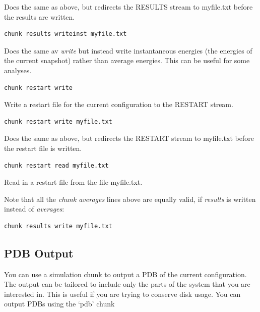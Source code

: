\documentclass[letterpaper,10pt,english]{sphinxmanual}
\begin{document}
Does the same as above, but redirects the RESULTS stream to myfile.txt before the results are written.

\begin{Verbatim}[commandchars=\\\{\}]
chunk results writeinst myfile.txt
\end{Verbatim}

Does the same av \emph{write} but instead write instantaneous energies (the energies of the current snapshot) rather than average energies. This can be useful for some analyses.

\begin{Verbatim}[commandchars=\\\{\}]
chunk restart write
\end{Verbatim}

Write a restart file for the current configuration to the RESTART stream.

\begin{Verbatim}[commandchars=\\\{\}]
chunk restart write myfile.txt
\end{Verbatim}

Does the same as above, but redirects the RESTART stream to myfile.txt before the restart file is written.

\begin{Verbatim}[commandchars=\\\{\}]
chunk restart read myfile.txt
\end{Verbatim}

Read in a restart file from the file myfile.txt.

Note that all the \emph{chunk averages} lines above are equally valid, if \emph{results} is written instead of \emph{averages}:

\begin{Verbatim}[commandchars=\\\{\}]
chunk results write myfile.txt
\end{Verbatim}


\subsection{PDB Output}
\label{protoms:pdb-output}
You can use a simulation chunk to output a PDB of the current configuration. The output can be tailored to include only the parts of the system that you are interested in. This is useful if you are trying to conserve disk usage. You can output PDBs using the ‘pdb’ chunk
\end{document}
